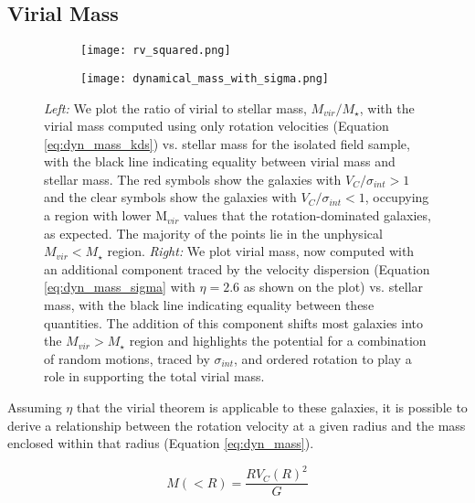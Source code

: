 \documentclass[fleqn,usenatbib]{mnras}
\begin{document}
\subsection{Virial Mass}\label{subsec:dynamical_masses}

\begin{figure*}
    \centering \hspace{-1.3cm}
    \begin{subfigure}[h!]{0.5\textwidth}
        \centering
        \texttt{[image: rv\_squared.png]}
    \end{subfigure} \hspace{+0.4cm}
    \begin{subfigure}[h!]{0.5\textwidth}
        \centering
        \texttt{[image: dynamical\_mass\_with\_sigma.png]}
    \end{subfigure}
    \caption{{\it Left:} We plot the ratio of virial to stellar mass, $M_{vir}/M_{\star}$, with the virial mass computed using only rotation velocities (Equation \protect\ref{eq:dyn_mass_kds}) vs. stellar mass for the isolated field sample, with the black line indicating equality between virial mass and stellar mass.
    The red symbols show the galaxies with $V_{C}/\sigma_{int} > 1$ and the clear symbols show the galaxies with $V_{C}/\sigma_{int} < 1$, occupying a region with lower M$_{vir}$ values that the rotation-dominated galaxies, as expected.
    The majority of the points lie in the unphysical $M_{vir} < M_{\star}$ region.
    {\it Right:} We plot virial mass, now computed with an additional component traced by the velocity dispersion (Equation \protect\ref{eq:dyn_mass_sigma} with $\eta=2.6$ as shown on the plot) vs. stellar mass, with the black line indicating equality between these quantities.
    The addition of this component shifts most galaxies into the $M_{vir} > M_{\star}$ region and highlights the potential for a combination of random motions, traced by $\sigma_{int}$, and ordered rotation to play a role in supporting the total virial mass.}
    \label{fig:dyn_masses}
\end{figure*}

Assuming $\eta$ that the virial theorem is applicable to these galaxies, it is possible to derive a relationship between the rotation velocity at a given radius and the mass enclosed within that radius (Equation \ref{eq:dyn_mass}). 

\begin{equation}\label{eq:dyn_mass}
   M\left(<R\right) = \frac{RV_{C}(R)^{2}}{G}
\end{equation}
\end{document}
